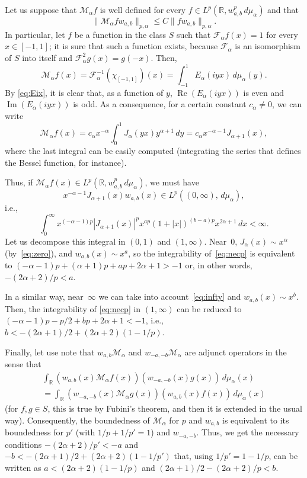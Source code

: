 \documentclass[a4paper]{amsart}
\theoremstyle{plain}
\theoremstyle{remark}
\newcommand{\R}{\mathbb{R}}
\newcommand{\Real}{\operatorname{Re}} %
\newcommand{\Imag}{\operatorname{Im}} %
\newcommand{\Fa}{\mathcal{F}_\alpha} %
\newcommand{\Ma}{\mathcal{M}_\alpha} %
\newcommand{\mua}{\mu_\alpha}
\newcommand{\pa}{{p,\alpha}}
\begin{document}
Let us suppose that $\Ma f$ is well defined for every $f \in L^p(\R,w_{a,b}^p\,d\mua)$ and that
\begin{equation*}
   \|\Ma f w_{a,b}\|_\pa \le C \|fw_{a,b}\|_\pa.
\end{equation*}
In particular, let $f$ be a function in the class $S$ such that $\Fa f(x) = 1$ for every $x \in [-1,1]$;
it is sure that such a function exists, because $\Fa$ is an isomorphism of $S$ into itself and $\Fa^2g(x) = g(-x)$. Then,
$$
  \Ma f(x) = \Fa^{-1}(\chi_{[-1,1]})(x)
  = \int_{-1}^{1} E_{\alpha}(iyx)\,d\mua(y).
$$
By \eqref{eq:Eix}, it is clear that, as a function of $y$, $\Real(E_{\alpha}(iyx))$ is even and $\Imag(E_{\alpha}(iyx))$ is odd. As a consequence, for a certain constant $c_\alpha \ne 0$, we can write
$$
  \Ma f(x) = c_\alpha x^{-\alpha} \int_{0}^{1} J_{\alpha}(yx) y^{\alpha+1}\,dy
  = c_\alpha x^{-\alpha-1} J_{\alpha+1}(x),
$$
where the last integral can be easily computed (integrating the series that defines the Bessel function, for instance).

Thus, if $\Ma f(x) \in L^p(\R,w_{a,b}^p\,d\mua)$, we must have
\begin{equation*}
  x^{-\alpha-1} J_{\alpha+1}(x)w_{a,b}(x) \in L^p((0,\infty),\,d\mua),
\end{equation*}
i.e.,
\begin{equation}
\label{eq:necp}
  \int_0^\infty x^{(-\alpha-1)p}|J_{\alpha+1}(x)|^p x^{ap}(1+|x|)^{(b-a)p}
    x^{2\alpha+1}\,dx < \infty.
\end{equation}
Let us decompose this integral in $(0,1)$ and $(1,\infty)$.
Near~$0$, $J_{\alpha}(x) \sim x^\alpha$ (by~\eqref{eq:zero}), and $w_{a,b}(x) \sim x^a$, so the integrability of~\eqref{eq:necp} is equivalent to $(-\alpha-1)p + ({\alpha+1})p+ap+2\alpha+1 > -1$ or, in other words, $-(2\alpha+2)/p < a$.

In a similar way, near~$\infty$ we can take into account~\eqref{eq:infty} and $w_{a,b}(x) \sim x^b$. Then, the integrability of \eqref{eq:necp} in $(1,\infty)$ can be reduced to $(-\alpha-1)p - p/2 + bp+2\alpha+1 < -1$,
i.e., $b < -(2\alpha+1)/2 + (2\alpha+2)(1-1/p)$.

Finally, let use note that $w_{a,b}\Ma$ and $w_{-a,-b}\Ma$ are adjunct operators in the sense that
\begin{multline*}
  \int_\R (w_{a,b}(x)\Ma f(x))(w_{-a,-b}(x)g(x))\,d\mua(x) \\
  = \int_\R (w_{-a,-b}(x)\Ma g(x))(w_{a,b}(x)f(x))\,d\mua(x)
\end{multline*}
(for $f, g \in S$, this is true by Fubini's theorem, and then it is extended in the usual way). Consequently, the boundedness of $\Ma$ for $p$ and $w_{a,b}$ is equivalent to its boundedness for $p'$ (with $1/p+1/p'=1$) and $w_{-a,-b}$. Thus, we get the necessary conditions $-(2\alpha+2)/p' < -a$ and $-b < -(2\alpha+1)/2 + (2\alpha+2)(1-1/p')$ that, using $1/p' = 1-1/p$, can be written as $a < (2\alpha+2)(1-1/p)$ and $(2\alpha+1)/2 - (2\alpha+2)/p < b$.
\end{document}
